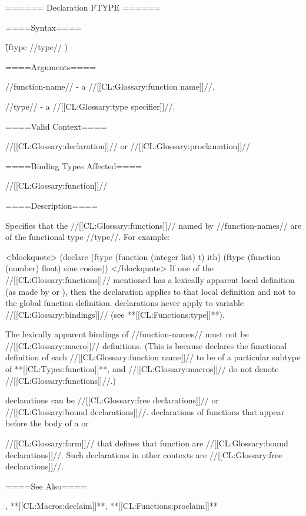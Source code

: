 ====== Declaration FTYPE ======

====Syntax====

\f{(ftype //type// )}

====Arguments====

//function-name// - a //[[CL:Glossary:function name]]//.

//type// - a //[[CL:Glossary:type specifier]]//.

====Valid Context====

//[[CL:Glossary:declaration]]// or //[[CL:Glossary:proclamation]]//

====Binding Types Affected====

//[[CL:Glossary:function]]//

====Description====

Specifies that the //[[CL:Glossary:functions]]// named by //function-names// are of the functional type //type//. For example:

<blockquote> (declare (ftype (function (integer list) t) ith) (ftype (function (number) float) sine cosine)) </blockquote> If one of the //[[CL:Glossary:functions]]// mentioned has a lexically apparent local definition (as made by  or ), then the declaration applies to that local definition and not to the global function definition.  declarations never apply to variable //[[CL:Glossary:bindings]]// (see **[[CL:Functions:type]]**).

The lexically apparent bindings of //function-names// must not be //[[CL:Glossary:macro]]// definitions. (This is because  declares the functional definition of each //[[CL:Glossary:function name]]// to be of a particular subtype of **[[CL:Types:function]]**, and //[[CL:Glossary:macros]]// do not denote //[[CL:Glossary:functions]]//.)


declarations can be //[[CL:Glossary:free declarations]]// or //[[CL:Glossary:bound declarations]]//.  declarations of functions that appear before the body of a  or 

//[[CL:Glossary:form]]// that defines that function are //[[CL:Glossary:bound declarations]]//. Such declarations in other contexts are //[[CL:Glossary:free declarations]]//.

====See Also====

, **[[CL:Macros:declaim]]**, **[[CL:Functions:proclaim]]**

     
